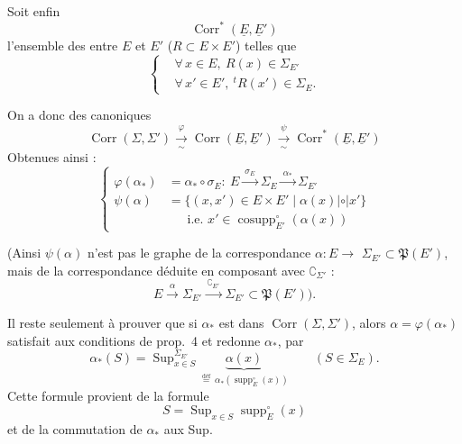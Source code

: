 \documentclass[11pt,a4paper]{article}
\begin{document}
Soit enfin
\[
  \operatorname{Corr}^{*}(\underline{E}, \underline{E}')
\]
l'ensemble des   entre  $E$ et $E'$ ($R \subset E \times E'$) telles que
\[
  \left\{
  \begin{aligned}
    &\forall\, x \in E, \ R(x) \in \Sigma_{E'} \\
    &\forall\, x' \in E', \ {}^{t}R(x') \in \Sigma_E .
  \end{aligned}
  \right.
\]

On a donc des    canoniques
\[
  \operatorname{Corr}(\Sigma, \Sigma') \xrightarrow[\sim]{\ \varphi\ } \operatorname{Corr}(\underline{E}, \underline{E}') \xrightarrow[\sim]{\ \psi\ } \operatorname{Corr}^{*}(\underline{E}, \underline{E}')
\]
Obtenues ainsi :
\[
  \left\{
  \begin{aligned}
    \varphi(\alpha_{*}) &= \alpha_{*} \circ \sigma_E : \ E \xrightarrow{\ \sigma_E\ } \Sigma_E \xrightarrow{\ \alpha_{*}\ } \Sigma_{E'} \\
    \psi(\alpha) &= \{(x, x') \in E \times E' \mid \alpha(x) \mathrel{|\circ|} x'\} \\
    &\phantom{=}\ \text{i.e. } x' \in \operatorname{cosupp}^{\circ}_{E'}(\alpha(x))
  \end{aligned}
  \right.
\]

(Ainsi $\psi(\alpha)$ n'est pas le graphe de la correspondance $\alpha : E \to$  $\Sigma_{E'} \subset \mathfrak{P}(E')$, mais de la correspondance déduite en composant avec $\complement_{\Sigma'}$ :
\[
  E \xrightarrow{\ \alpha\ } \Sigma_{E'} \xrightarrow{\ \complement_{E'}\ } \Sigma_{E'} \subset \mathfrak{P}(E') \text{).}
\]


Il reste seulement à prouver que si $\alpha_{*}$ est dans $\operatorname{Corr}(\Sigma, \Sigma')$, alors $\alpha = \varphi(\alpha_{*})$ satisfait aux conditions de prop.~4 et redonne $\alpha_{*}$, par
\[
  \alpha_{*}(S) = \operatorname{Sup}^{\Sigma_{E'}}_{x \in S} \underbrace{\alpha(x)}_{\overset{\text{déf}}{=}\ \alpha_{*}(\operatorname{supp}^{\circ}_E(x))} \qquad (S \in \Sigma_E) .
\]
Cette formule \struck{\ill{}} provient de la formule
\[
  S = \operatorname{Sup}_{x \in S} \operatorname{supp}^{\circ}_E(x)
\]
et de la commutation de $\alpha_{*}$ aux Sup.
\end{document}
